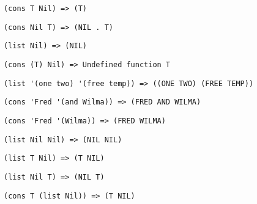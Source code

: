 \problem \hfill

\begin{lstlisting}
(cons T Nil) => (T)
\end{lstlisting}


\problem \hfill

\begin{lstlisting}
(cons Nil T) => (NIL . T)
\end{lstlisting}


\problem \hfill

\begin{lstlisting}
(list Nil) => (NIL)
\end{lstlisting}


\problem \hfill

\begin{lstlisting}
(cons (T) Nil) => Undefined function T
\end{lstlisting}


\problem \hfill

\begin{lstlisting}
(list '(one two) '(free temp)) => ((ONE TWO) (FREE TEMP))
\end{lstlisting}


\problem \hfill

\begin{lstlisting}
(cons 'Fred '(and Wilma)) => (FRED AND WILMA)
\end{lstlisting}


\problem \hfill

\begin{lstlisting}
(cons 'Fred '(Wilma)) => (FRED WILMA)
\end{lstlisting}


\problem \hfill

\begin{lstlisting}
(list Nil Nil) => (NIL NIL)
\end{lstlisting}


\problem \hfill

\begin{lstlisting}
(list T Nil) => (T NIL)
\end{lstlisting}


\problem \hfill

\begin{lstlisting}
(list Nil T) => (NIL T)
\end{lstlisting}


\problem \hfill

\begin{lstlisting}
(cons T (list Nil)) => (T NIL)
\end{lstlisting}


